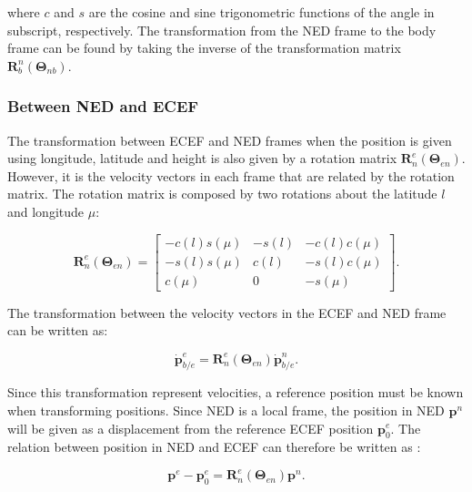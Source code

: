 where $c$ and $s$ are the cosine and sine trigonometric functions of the angle in subscript, respectively. The transformation from the NED frame to the body frame can be found by taking the inverse of the transformation matrix $\mathbf{R}_b^n(\bm{\Theta}_{nb})$.

\subsubsection{Between NED and ECEF}

The transformation between ECEF and NED frames when the position is given using longitude, latitude and height is also given by a rotation matrix $\mathbf{R}_n^e(\bm{\Theta}_{en})$. However, it is the velocity vectors in each frame that are related by the rotation matrix. The rotation matrix is composed by two rotations about the latitude $l$ and longitude $\mu$:

\begin{equation}
	\mathbf{R}_n^e(\bm{\Theta}_{en}) =
	\begin{bmatrix}
		-c(l)s(\mu) & -s(l) & -c(l)c(\mu) \\
		-s(l)s(\mu) & c(l) & -s(l)c(\mu) \\
		c(\mu) & 0 & -s(\mu)
	\end{bmatrix}.
\end{equation}

The transformation between the velocity vectors in the ECEF and NED frame can be written as:

\begin{equation}
	\mathbf{\dot{p}}_{b/e}^e = \mathbf{R}_n^e(\bm{\Theta}_{en})\mathbf{\dot{p}}_{b/e}^n.
\end{equation}

Since this transformation represent velocities, a reference position must be known when transforming positions. Since NED is a local frame, the position in NED $\mathbf{p}^n$ will be given as a displacement from the reference ECEF position $\mathbf{p}_0^e$. The relation between position in NED and ECEF can therefore be written as \cite{ROTATION}:

\begin{equation}
	\mathbf{p}^e - \mathbf{p}_0^e = \mathbf{R}_n^e(\bm{\Theta}_{en}) \mathbf{p}^n.
\end{equation} 